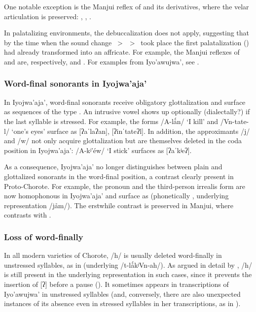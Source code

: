 One notable exception is the Manjui reflex of  and its derivatives, where the velar articulation is preserved: , , .

In palatalizing environments, the debuccalization does not apply, suggesting that by the time when the sound change ~>~~>~ took place the first palatalization () had already transformed  into an affricate. For example, the Manjui reflexes of  and  are, respectively,  and . For examples from Iyo’awujwa’, see \citet[45]{AG83}.

\subsubsection{Word-final sonorants in Iyojwa’aja’}

In Iyojwa’aja’, word-final sonorants receive obligatory glottalization \citep[87--88]{JC14b} and surface as sequences of the type . An intrusive vowel shows up optionally (dialectally?) if the last syllable is stressed. For example, the forms /A\mbox{-}lǻn/ `I kill' and /Vn\mbox{-}tate\mbox{-}l/ `one's eyes' surface as [ʔaˈlaʔan], [ʔinˈtateʔl]. In addition, the approximants /j/ and /w/ not only acquire glottalization but are themselves deleted in the coda position in Iyojwa’aja’: /A\mbox{-}kʲ’éw/ `I stick' surfaces as [ʔaˈkʲeʔ].

As a consequence, Iyojwa’aja’ no longer distinguishes between plain and glottalized sonorants in the word-final position, a contrast clearly present in Proto-Chorote. For example, the pronoun  and the third-person irrealis form  are now homophonous in Iyojwa’aja’ and surface as  (phonetically , underlying representation /jåm/). The erstwhile contrast is preserved in Manjui, where  contrasts with .

\subsubsection{Loss of  word-finally}\label{ch-caida-de-h-final}

In all modern varieties of Chorote, /h/ is usually deleted word-finally in unstressed syllables, as in  (underlying /t\mbox{-}lǻkʲVn\mbox{-}ah/). As argued in detail by \citet[85--89]{JC14b}, /h/ is still present in the underlying representation in such cases, since it prevents the insertion of [ʔ] before a pause (). It sometimes appears in  transcriptions of Iyo’awujwa’ in unstressed syllables (and, conversely, there are also unexpected instances of its absence even in stressed syllables in her transcriptions, as in ).

